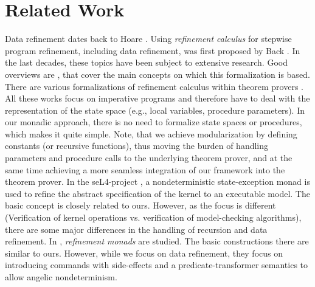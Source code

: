 \documentclass[11pt,a4paper]{book}
\begin{document}
\section{Related Work}
Data refinement dates back to Hoare \cite{Hoa72}. Using 
{\em refinement calculus} for stepwise program refinement, including data
refinement, was first proposed by Back \cite{Back78}.  In the last
decades, these topics have been subject to extensive research. Good
overviews are \cite{BaWr98,RoEn98}, that cover the main concepts on
which this formalization is based.  There are various formalizations
of refinement calculus within theorem provers
\cite{BaWr90,LRW95,RuWr97,Stap99,Preo06}.  All these works focus on
imperative programs and therefore have to deal with the representation
of the state space (e.g., local variables, procedure parameters).  In
our monadic approach, there is no need to formalize state spaces or
procedures, which makes it quite simple. Note, that we achieve
modularization by defining constants (or recursive functions), thus
moving the burden of handling parameters and procedure calls to the
underlying theorem prover, and at the same time achieving a more
seamless integration of our framework into the theorem prover. 
In the seL4-project \cite{CKS08}, a nondeterministic state-exception monad is
used to refine the abstract specification of the kernel to an
executable model. The basic concept is closely related to ours.
However, as the focus is different (Verification of kernel operations vs. 
verification of model-checking algorithms), there are some major differences in
the handling of recursion and data refinement. 
In \cite{SchM98}, {\em refinement monads} are studied. 
The basic constructions there are similar to ours. However, while we focus on
data refinement, they focus on introducing commands with side-effects and a 
predicate-transformer semantics to allow angelic nondeterminism.
\end{document}
